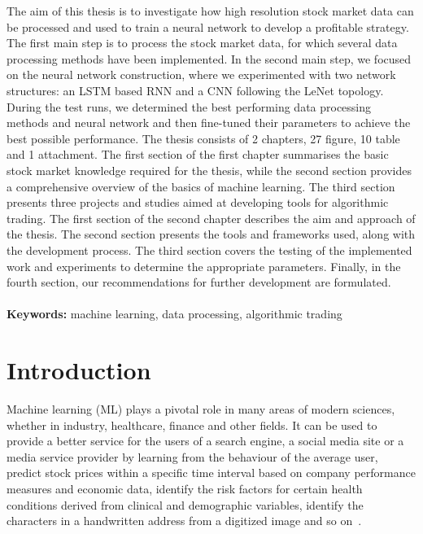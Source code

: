 \documentclass[a4paper,oneside,onecolumn,12pt]{book}
\begin{document}
\thispagestyle{empty}
The aim of this thesis is to investigate how high resolution stock market data can be processed and used to train a neural network to develop a profitable strategy. The first main step is to process the stock market data, for which several data processing methods have been implemented. In the second main step, we focused on the neural network construction, where we experimented with two network structures: an LSTM based RNN and a CNN following the LeNet topology. During the test runs, we determined the best performing data processing methods and neural network and then fine-tuned their parameters to achieve the best possible performance. The thesis consists of 2 chapters, 27 figure, 10 table and 1 attachment. The first section of the first chapter summarises the basic stock market knowledge required for the thesis, while the second section provides a comprehensive overview of the basics of machine learning. The third section presents three projects and studies aimed at developing tools for algorithmic trading. The first section of the second chapter describes the aim and approach of the thesis. The second section presents the tools and frameworks used, along with the development process. The third section covers the testing of the implemented work and experiments to determine the appropriate parameters. Finally, in the fourth section, our recommendations for further development are formulated.
\\\\
\textbf{Keywords:} machine learning, data processing, algorithmic trading
\pagebreak

\tableofcontents
\listoffigures

\pagebreak
\section*{Introduction}
Machine learning (ML) plays a pivotal role in many areas of modern sciences, whether in industry, healthcare, finance and other fields. It can be used to provide a better service for the users of a search engine, a social media site or a media service provider by learning from the behaviour of the average user, predict stock prices within a specific time interval based on company performance measures and economic data, identify the risk factors for certain health conditions derived from clinical and demographic variables, identify the characters in a handwritten address from a digitized image and so on~\cite{TESL}.
\end{document}
